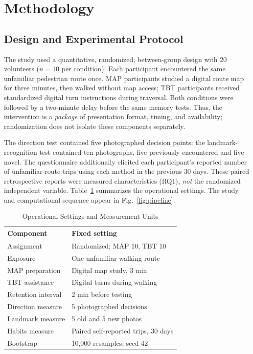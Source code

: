\section{Methodology}\label{sec:methods}
\subsection{Design and Experimental Protocol}
The study used a quantitative, randomized, between-group design with 20 volunteers ($n=10$ per condition). Each participant encountered the same unfamiliar pedestrian route once. MAP participants studied a digital route map for three minutes, then walked without map access; TBT participants received standardized digital turn instructions during traversal. Both conditions were followed by a two-minute delay before the same memory tests. Thus, the intervention is a \emph{package} of presentation format, timing, and availability; randomization does not isolate these components separately.

The direction test contained five photographed decision points; the landmark-recognition test contained ten photographs, five previously encountered and five novel. The questionnaire additionally elicited each participant's reported number of unfamiliar-route trips using each method in the previous 30 days. These paired retrospective reports were measured characteristics (RQ1), \emph{not} the randomized independent variable. Table~\ref{tab:protocol} summarizes the operational settings. The study and computational sequence appear in Fig.~\ref{fig:pipeline}.
\begin{table}[t]
\caption{Operational Settings and Measurement Units}\label{tab:protocol}
\centering\footnotesize
\begin{tabular}{p{}p{}}\toprule
Component & Fixed setting \\\midrule
Assignment & Randomized; MAP 10, TBT 10 \\
Exposure & One unfamiliar walking route \\
MAP preparation & Digital map study, 3 min \\
TBT assistance & Digital turns during walking \\
Retention interval & 2 min before testing \\
Direction measure & 5 photographed decisions \\
Landmark measure & 5 old and 5 new photos \\
Habits measure & Paired self-reported trips, 30 days \\
Bootstrap & 10,000 resamples; seed 42 \\\bottomrule
\end{tabular}
\end{table}

